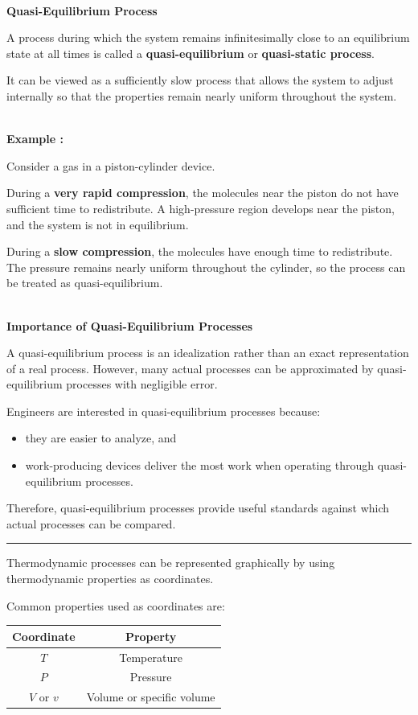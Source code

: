 \documentclass[12pt]{article}
\newcommand{\mysubsection}[2]{%
    \noindent{\headingfont\large #1\space #2\par}
    \vspace{4pt}
    \hrule
    \vspace{15pt}
}
\begin{document}
\textbf{\\ Quasi-Equilibrium Process}

A process during which the system remains infinitesimally close to an equilibrium state at all times is called a \textbf{quasi-equilibrium} or \textbf{quasi-static process}.

It can be viewed as a sufficiently slow process that allows the system to adjust internally so that the properties remain nearly uniform throughout the system.

\textbf{\\ Example : }

Consider a gas in a piston-cylinder device.

During a \textbf{very rapid compression}, the molecules near the piston do not have sufficient time to redistribute. A high-pressure region develops near the piston, and the system is not in equilibrium.

During a \textbf{slow compression}, the molecules have enough time to redistribute. The pressure remains nearly uniform throughout the cylinder, so the process can be treated as quasi-equilibrium.

\textbf{\\ Importance of Quasi-Equilibrium Processes}

A quasi-equilibrium process is an idealization rather than an exact representation of a real process. However, many actual processes can be approximated by quasi-equilibrium processes with negligible error.

Engineers are interested in quasi-equilibrium processes because:
\begin{itemize}
    \item they are easier to analyze, and
    \item work-producing devices deliver the most work when operating through quasi-equilibrium processes.
\end{itemize}

Therefore, quasi-equilibrium processes provide useful standards against which actual processes can be compared.

\mysubsection{}{Process Diagrams and Process Path}

Thermodynamic processes can be represented graphically by using thermodynamic properties as coordinates.

Common properties used as coordinates are:
\begin{center}
    \begin{tabular}{|c|c|}
        \hline
        \textbf{Coordinate} & \textbf{Property} \\
        \hline
        $T$ & Temperature \\
        \hline
        $P$ & Pressure \\
        \hline
        $V$ or $v$ & Volume or specific volume \\
        \hline
    \end{tabular}
\end{center}
\end{document}
